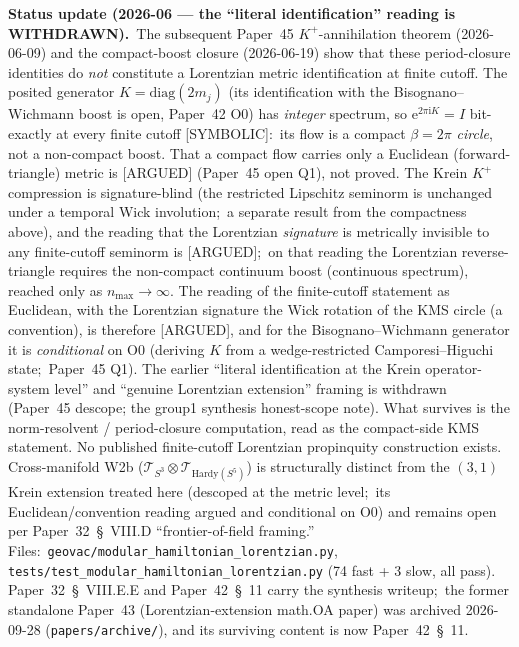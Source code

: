\documentclass[11pt]{article}
\begin{document}
\textbf{Status update (2026-06 --- the ``literal identification''
reading is WITHDRAWN).}\ The subsequent Paper~45 $K^+$-annihilation
theorem (2026-06-09) and the compact-boost closure (2026-06-19) show
that these period-closure identities do \emph{not} constitute a
Lorentzian metric identification at finite cutoff.  The posited
generator $K = \mathrm{diag}(2m_j)$ (its identification with
the Bisognano--Wichmann boost is open, Paper~42 O0) has
\emph{integer} spectrum, so $\mathrm{e}^{2\pi\mathrm{i}K} = I$
bit-exactly at every finite cutoff [SYMBOLIC]:\ its flow is a compact
$\beta = 2\pi$ \emph{circle}, not a non-compact boost.  That a compact
flow carries only a Euclidean (forward-triangle) metric is [ARGUED]
(Paper~45 open Q1), not proved.
The Krein $K^+$ compression is signature-blind (the restricted
Lipschitz seminorm is unchanged under a temporal Wick involution;\ a
separate result from the compactness above), and the reading that the
Lorentzian \emph{signature} is metrically invisible to any
finite-cutoff seminorm is [ARGUED];\ on that reading the Lorentzian reverse-triangle requires the
non-compact continuum boost (continuous spectrum), reached only as
$n_{\max}\to\infty$.  The reading of the finite-cutoff statement as
Euclidean, with the Lorentzian signature the Wick rotation of the KMS
circle (a convention), is therefore [ARGUED], and for the
Bisognano--Wichmann generator it is \emph{conditional} on O0 (deriving
$K$ from a wedge-restricted Camporesi--Higuchi state;\ Paper~45 Q1).
The earlier ``literal identification at the
Krein operator-system level'' and ``genuine Lorentzian extension''
framing is withdrawn (Paper~45 descope; the group1 synthesis
honest-scope note).  What survives is the norm-resolvent /
period-closure computation, read as the compact-side KMS statement.
No published finite-cutoff Lorentzian propinquity construction exists.  Cross-manifold W2b
($\mathcal{T}_{S^3} \otimes \mathcal{T}_{\mathrm{Hardy}(S^5)}$) is
structurally distinct from the $(3, 1)$ Krein extension treated here
(descoped at the metric level;\ its Euclidean/convention reading argued
and conditional on O0) and
remains open per Paper~32~\S~VIII.D ``frontier-of-field framing.''
Files:\ \verb|geovac/modular_hamiltonian_lorentzian.py|,
\verb|tests/test_modular_hamiltonian_lorentzian.py| (74 fast + 3 slow,
all pass).
Paper~32~\S~VIII.E.E and Paper~42~\S~11 carry the synthesis
writeup;\ the former standalone Paper~43 (Lorentzian-extension math.OA
paper) was archived 2026-09-28 (\verb|papers/archive/|), and its
surviving content is now Paper~42~\S~11.
\end{document}
